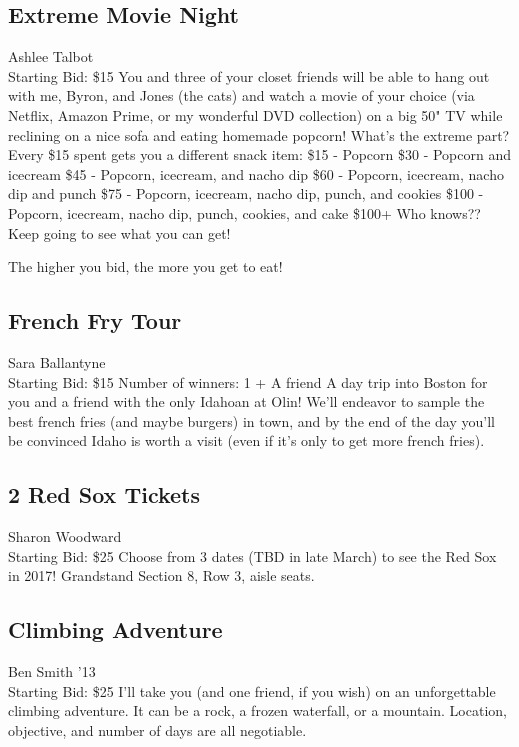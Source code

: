 \documentclass[11pt]{article}
\begin{document}
\subsection{Extreme Movie Night}
Ashlee Talbot
\\
Starting Bid: \$15
\newline
You and three of your closet friends will be able to hang out with me, Byron, and Jones (the cats) and watch a movie of your choice (via Netflix, Amazon Prime, or my wonderful DVD collection) on a big 50" TV while reclining on a nice sofa and eating homemade popcorn! What's the extreme part?  Every \$15 spent gets you a different snack item:
\$15 - Popcorn
\$30 - Popcorn and icecream
\$45 - Popcorn, icecream, and nacho dip
\$60 - Popcorn, icecream, nacho dip and punch
\$75 - Popcorn, icecream, nacho dip, punch, and cookies
\$100 - Popcorn, icecream, nacho dip, punch, cookies, and cake
\$100+ Who knows?? Keep going to see what you can get!

The higher you bid, the more you get to eat!
\subsection{French Fry Tour }
Sara Ballantyne
\\
Starting Bid: \$15
\newline
Number of winners: 1 + A friend 
\newline
A day trip into Boston for you and a friend with the only Idahoan at Olin! We'll endeavor to sample the best french fries (and maybe burgers) in town, and by the end of the day you'll be convinced Idaho is worth a visit (even if it's only to get more french fries).
\subsection{2 Red Sox Tickets }
Sharon Woodward
\\
Starting Bid: \$25
\newline
Choose from 3 dates (TBD in late March) to see the Red Sox in 2017!  Grandstand Section 8, Row 3, aisle seats.
\subsection{Climbing Adventure}
Ben Smith '13
\\
Starting Bid: \$25
\newline
I'll take you (and one friend, if you wish) on an unforgettable climbing adventure. It can be a rock, a frozen waterfall, or a mountain. Location, objective, and number of days are all negotiable. 
\end{document}
